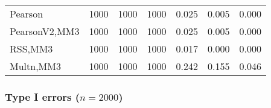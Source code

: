 \documentclass[
]{article}
\begin{document}
\begin{table}[H]
{\begin{tabular}[t]{lrrrrrr}
\hspace{1em}Pearson & 1000 & 1000 & 1000 & 0.025 & 0.005 & 0.000\\
\hspace{1em}PearsonV2,MM3 & 1000 & 1000 & 1000 & 0.025 & 0.005 & 0.000\\
\hspace{1em}RSS,MM3 & 1000 & 1000 & 1000 & 0.017 & 0.000 & 0.000\\
\hspace{1em}Multn,MM3 & 1000 & 1000 & 1000 & 0.242 & 0.155 & 0.046\\
\bottomrule
\end{tabular}}
\end{table}

\hypertarget{type-i-errors-n2000-3}{%
\subsubsection{\texorpdfstring{Type I errors
(\(n=2000\))}{Type I errors (n=2000)}}\label{type-i-errors-n2000-3}}
\end{document}
